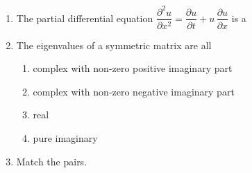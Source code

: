 \documentclass[journal]{IEEEtran}
\begin{document}
\begin{enumerate}[leftmargin=0pt]


\item The partial differential equation $\dfrac{\partial^2 u}{\partial x^2} = \dfrac{\partial u}{\partial t} + u\,\dfrac{\partial u}{\partial x}$ is a
\begin{enumerate}
\end{enumerate}

\hfill{}

\item The eigenvalues of a symmetric matrix are all
\begin{enumerate}
\item complex with non-zero positive imaginary part
\item complex with non-zero negative imaginary part
\item real
\item pure imaginary

\end{enumerate}

\hfill{}

\item Match the  pairs.

\begin{table}[h]
    \centering
    
\end{table}
\begin{enumerate}
\end{enumerate}

\hfill{}


\end{enumerate}
\end{document}
